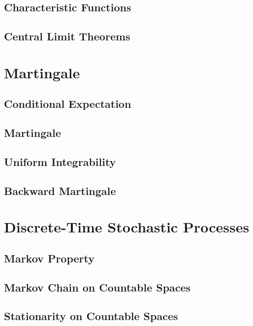 \documentclass[a4paper, 12pt]{article}
\begin{document}
\subsection{Characteristic Functions}

\newpage

\subsection{Central Limit Theorems}

\newpage

\section{Martingale}

\subsection{Conditional Expectation}

\newpage

\subsection{Martingale}

\newpage

\subsection{Uniform Integrability}

\newpage

\subsection{Backward Martingale}

\newpage

\section{Discrete-Time Stochastic Processes}
\subsection{Markov Property}

\newpage

\subsection{Markov Chain on Countable Spaces}

\newpage

\subsection{Stationarity on Countable Spaces}

\newpage
\end{document}
